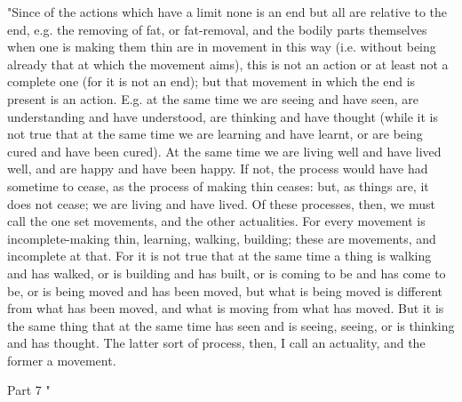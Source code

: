 "Since of the actions which have a limit none is an end but all are
relative to the end, e.g. the removing of fat, or fat-removal, and
the bodily parts themselves when one is making them thin are in movement
in this way (i.e. without being already that at which the movement
aims), this is not an action or at least not a complete one (for it
is not an end); but that movement in which the end is present is an
action. E.g. at the same time we are seeing and have seen, are understanding
and have understood, are thinking and have thought (while it is not
true that at the same time we are learning and have learnt, or are
being cured and have been cured). At the same time we are living well
and have lived well, and are happy and have been happy. If not, the
process would have had sometime to cease, as the process of making
thin ceases: but, as things are, it does not cease; we are living
and have lived. Of these processes, then, we must call the one set
movements, and the other actualities. For every movement is incomplete-making
thin, learning, walking, building; these are movements, and incomplete
at that. For it is not true that at the same time a thing is walking
and has walked, or is building and has built, or is coming to be and
has come to be, or is being moved and has been moved, but what is
being moved is different from what has been moved, and what is moving
from what has moved. But it is the same thing that at the same time
has seen and is seeing, seeing, or is thinking and has thought. The
latter sort of process, then, I call an actuality, and the former
a movement. 

Part 7 "

